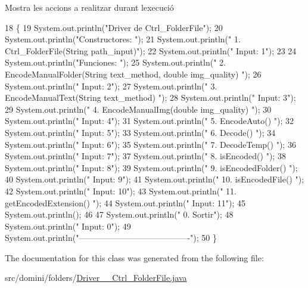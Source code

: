 Mostra les accions a realitzar durant l\textquotesingle{}execució 


\begin{DoxyCode}
18                                      \{
19         System.out.println(\textcolor{stringliteral}{"Driver de Ctrl\_FolderFile"});
20         System.out.println(\textcolor{stringliteral}{"Constructores: "});
21         System.out.println(\textcolor{stringliteral}{"     1. Ctrl\_FolderFile(String path\_input)"});
22         System.out.println(\textcolor{stringliteral}{"     Input: 1"});
23 
24         System.out.println(\textcolor{stringliteral}{"Funciones: "});
25         System.out.println(\textcolor{stringliteral}{"     2. EncodeManualFolder(String text\_method, double img\_quality) "});
26         System.out.println(\textcolor{stringliteral}{"     Input: 2"});
27         System.out.println(\textcolor{stringliteral}{"     3. EncodeManualText(String text\_method) "});
28         System.out.println(\textcolor{stringliteral}{"     Input: 3"});
29         System.out.println(\textcolor{stringliteral}{"     4. EncodeManualImg(double img\_quality) "});
30         System.out.println(\textcolor{stringliteral}{"     Input: 4"});
31         System.out.println(\textcolor{stringliteral}{"     5. EncodeAuto() "});
32         System.out.println(\textcolor{stringliteral}{"     Input: 5"});
33         System.out.println(\textcolor{stringliteral}{"     6. Decode() "});
34         System.out.println(\textcolor{stringliteral}{"     Input: 6"});
35         System.out.println(\textcolor{stringliteral}{"     7. DecodeTemp() "});
36         System.out.println(\textcolor{stringliteral}{"     Input: 7"});
37         System.out.println(\textcolor{stringliteral}{"     8. isEncoded() "});
38         System.out.println(\textcolor{stringliteral}{"     Input: 8"});
39         System.out.println(\textcolor{stringliteral}{"     9. isEncodedFolder() "});
40         System.out.println(\textcolor{stringliteral}{"     Input: 9"});
41         System.out.println(\textcolor{stringliteral}{"     10. isEncodedFile() "});
42         System.out.println(\textcolor{stringliteral}{"     Input: 10"});
43         System.out.println(\textcolor{stringliteral}{"     11. getEncodedExtension() "});
44         System.out.println(\textcolor{stringliteral}{"     Input: 11"});
45         System.out.println();
46 
47         System.out.println(\textcolor{stringliteral}{"     0. Sortir"});
48         System.out.println(\textcolor{stringliteral}{"     Input: 0"});
49         System.out.println(\textcolor{stringliteral}{"----------------------------------------"});
50     \}
\end{DoxyCode}


The documentation for this class was generated from the following file\+:\begin{DoxyCompactItemize}
\item 
src/domini/folders/\hyperlink{Driver____Ctrl__FolderFile_8java}{Driver\+\_\+\+\_\+\+Ctrl\+\_\+\+Folder\+File.\+java}\end{DoxyCompactItemize}
